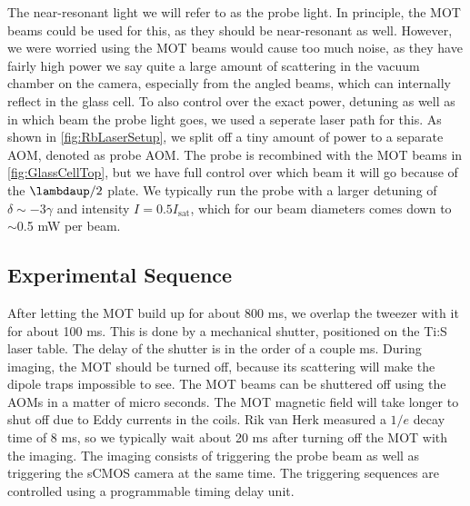 The near-resonant light we will refer to as the probe light. 
In principle, the MOT beams could be used for this, as they should be near-resonant as well. 
However, we were worried using the MOT beams would cause too much noise, as they have fairly high power we say quite a large amount of scattering in the vacuum chamber on the camera, especially from the angled beams, which can internally reflect in the glass cell.
To also control over the exact power, detuning as well as in which beam the probe light goes, we used a seperate laser path for this. 
As shown in \cref{fig:RbLaserSetup}, we split off a tiny amount of power to a separate AOM, denoted as probe AOM. 
The probe is recombined with the MOT beams in \cref{fig:GlassCellTop}, but we have full control over which beam it will go because of the $\lambdaup/2$ plate.
We typically run the probe with a larger detuning of $\delta \sim -3\gamma$ and intensity $I = 0.5 I_{\text{sat}}$, which for our beam diameters comes down to $\sim0.$5 mW per beam. 

\subsection{Experimental Sequence}

After letting the MOT build up for about 800 ms, we overlap the tweezer with it for about 100 ms.
This is done by a mechanical shutter, positioned on the \ac{Ti:S} laser table.
The delay of the shutter is in the order of a couple ms. 
During imaging, the MOT should be turned off, because its scattering will make the dipole traps impossible to see. 
The MOT beams can be shuttered off using the AOMs in a matter of micro seconds. 
The MOT magnetic field will take longer to shut off due to Eddy currents in the coils. 
Rik van Herk measured a $1/e$ decay time of 8 ms, so we typically wait about 20 ms after turning off the MOT with the imaging. 
The imaging consists of triggering the probe beam as well as triggering the sCMOS camera at the same time. 
The triggering sequences are controlled using a programmable timing delay unit.






